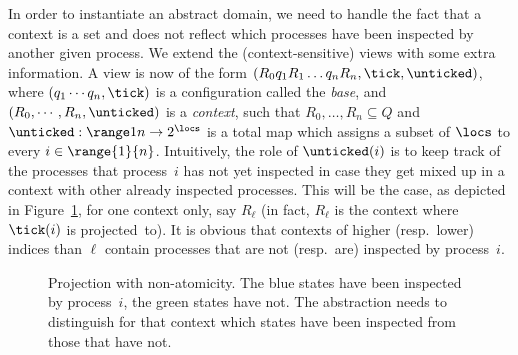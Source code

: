 %
%
In order to instantiate an abstract domain, we need to handle the fact
that a context is a set and does not reflect which processes have been
inspected by another given process.
%
%
We extend the (context-sensitive) views
with some extra information.
%
%
A view is now of the form %
$(R_0q_1R_1\ldots q_nR_{n},\tick,\unticked)$, %
where $(q_1\cdots q_n,\tick)$ is a configuration called the
\emph{base}, and $(R_0,\cdots,R_n,\unticked)$ is a \emph{context},
such that $R_0,\ldots,R_{n}\subseteq Q$ and $\unticked:\range 1
n\rightarrow 2^\locs$ is a total map which assigns a subset of
$\locs$ %
to every $i\in\range{1}{n}$.
%
Intuitively, the role of $\unticked(i)$ is to keep track of the
processes that process~$i$ has not yet inspected in case they get
mixed up in a context with other already inspected processes.
%
This will be the case, as depicted in
Figure~\ref{figure:projection-na}, for one context only, say $R_\ell$
(in fact, $R_\ell$ is the context where $\tick(i)$ is projected~to). %
It is obvious that contexts of higher (resp.\ lower) indices than
$\ell$ contain processes that are not (resp.\ are) inspected by
process~$i$.

\begingroup
\setlength{\intextsep}{\the\bigskipamount}
\begin{figure}[ht]
  \begin{minipage}{0.55\linewidth}
    \noindent{}
  \end{minipage}%
  \begin{minipage}{0.45\linewidth}
    \caption{Projection with non-atomicity. The blue states have been
      inspected by process~$i$, the green states have not. The
      abstraction needs to distinguish for that context which states
      have been inspected from those that have not.}
  \label{figure:projection-na}
  \end{minipage}
\end{figure}
\endgroup

